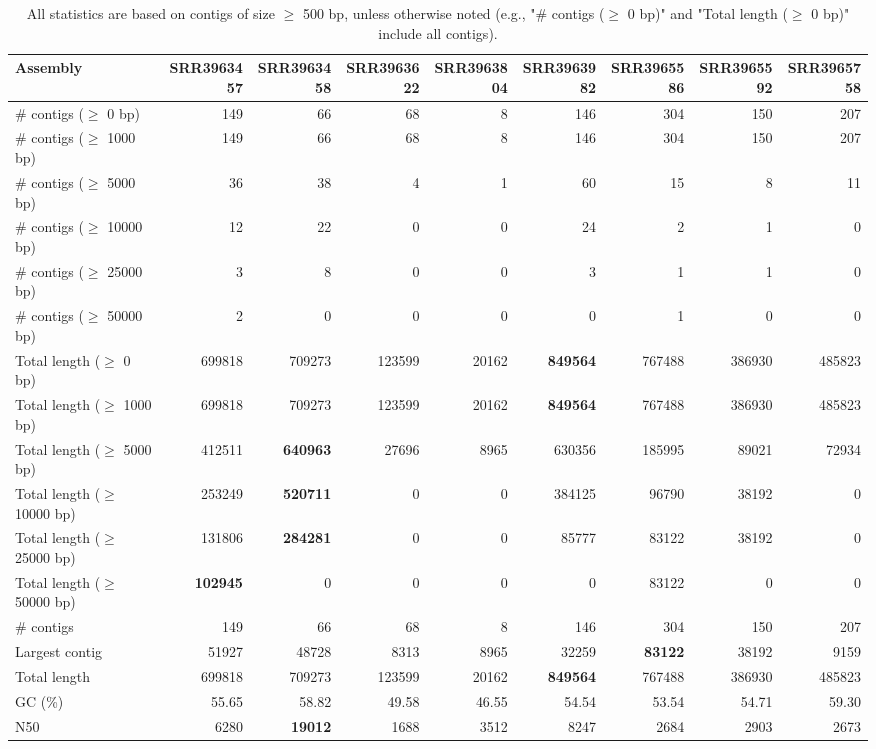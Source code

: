 \documentclass[12pt,a4paper]{article}
\begin{document}
\begin{table}[ht]
\begin{center}
\caption{All statistics are based on contigs of size $\geq$ 500 bp, unless otherwise noted (e.g., "\# contigs ($\geq$ 0 bp)" and "Total length ($\geq$ 0 bp)" include all contigs).}
\begin{tabular}{|l*{8}{|r}|}
\hline
Assembly & SRR3963457 & SRR3963458 & SRR3963622 & SRR3963804 & SRR3963982 & SRR3965586 & SRR3965592 & SRR3965758 \\ \hline
\# contigs ($\geq$ 0 bp) & 149 & 66 & 68 & 8 & 146 & 304 & 150 & 207 \\ \hline
\# contigs ($\geq$ 1000 bp) & 149 & 66 & 68 & 8 & 146 & 304 & 150 & 207 \\ \hline
\# contigs ($\geq$ 5000 bp) & 36 & 38 & 4 & 1 & 60 & 15 & 8 & 11 \\ \hline
\# contigs ($\geq$ 10000 bp) & 12 & 22 & 0 & 0 & 24 & 2 & 1 & 0 \\ \hline
\# contigs ($\geq$ 25000 bp) & 3 & 8 & 0 & 0 & 3 & 1 & 1 & 0 \\ \hline
\# contigs ($\geq$ 50000 bp) & 2 & 0 & 0 & 0 & 0 & 1 & 0 & 0 \\ \hline
Total length ($\geq$ 0 bp) & 699818 & 709273 & 123599 & 20162 & {\bf 849564} & 767488 & 386930 & 485823 \\ \hline
Total length ($\geq$ 1000 bp) & 699818 & 709273 & 123599 & 20162 & {\bf 849564} & 767488 & 386930 & 485823 \\ \hline
Total length ($\geq$ 5000 bp) & 412511 & {\bf 640963} & 27696 & 8965 & 630356 & 185995 & 89021 & 72934 \\ \hline
Total length ($\geq$ 10000 bp) & 253249 & {\bf 520711} & 0 & 0 & 384125 & 96790 & 38192 & 0 \\ \hline
Total length ($\geq$ 25000 bp) & 131806 & {\bf 284281} & 0 & 0 & 85777 & 83122 & 38192 & 0 \\ \hline
Total length ($\geq$ 50000 bp) & {\bf 102945} & 0 & 0 & 0 & 0 & 83122 & 0 & 0 \\ \hline
\# contigs & 149 & 66 & 68 & 8 & 146 & 304 & 150 & 207 \\ \hline
Largest contig & 51927 & 48728 & 8313 & 8965 & 32259 & {\bf 83122} & 38192 & 9159 \\ \hline
Total length & 699818 & 709273 & 123599 & 20162 & {\bf 849564} & 767488 & 386930 & 485823 \\ \hline
GC (\%) & 55.65 & 58.82 & 49.58 & 46.55 & 54.54 & 53.54 & 54.71 & 59.30 \\ \hline
N50 & 6280 & {\bf 19012} & 1688 & 3512 & 8247 & 2684 & 2903 & 2673 \\ \hline

\end{tabular}
\end{center}
\end{table}
\end{document}
